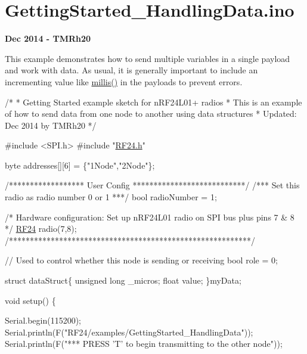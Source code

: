 \hypertarget{GettingStarted_HandlingData_8ino-example}{}\section{Getting\+Started\+\_\+\+Handling\+Data.\+ino}
{\bfseries Dec 2014 -\/ T\+M\+Rh20}~\newline


This example demonstrates how to send multiple variables in a single payload and work with data. As usual, it is generally important to include an incrementing value like \hyperlink{group__Porting__General_gad5b3ec1ce839fa1c4337a7d0312e9749}{millis()} in the payloads to prevent errors.


\begin{DoxyCodeInclude}

\textcolor{comment}{/*}
\textcolor{comment}{* Getting Started example sketch for nRF24L01+ radios}
\textcolor{comment}{* This is an example of how to send data from one node to another using data structures}
\textcolor{comment}{* Updated: Dec 2014 by TMRh20}
\textcolor{comment}{*/}

\textcolor{preprocessor}{#include <SPI.h>}
\textcolor{preprocessor}{#include "\hyperlink{RF24_8h}{RF24.h}"}

byte addresses[][6] = \{\textcolor{stringliteral}{"1Node"},\textcolor{stringliteral}{"2Node"}\};


\textcolor{comment}{/****************** User Config ***************************/}
\textcolor{comment}{/***      Set this radio as radio number 0 or 1         ***/}
\textcolor{keywordtype}{bool} radioNumber = 1;

\textcolor{comment}{/* Hardware configuration: Set up nRF24L01 radio on SPI bus plus pins 7 & 8 */}
\hyperlink{classRF24}{RF24} radio(7,8);
\textcolor{comment}{/**********************************************************/}


\textcolor{comment}{// Used to control whether this node is sending or receiving}
\textcolor{keywordtype}{bool} role = 0;

\textcolor{keyword}{struct }dataStruct\{
  \textcolor{keywordtype}{unsigned} \textcolor{keywordtype}{long} \_micros;
  \textcolor{keywordtype}{float} value;
\}myData;

\textcolor{keywordtype}{void} setup() \{

  Serial.begin(115200);
  Serial.println(F(\textcolor{stringliteral}{"RF24/examples/GettingStarted\_HandlingData"}));
  Serial.println(F(\textcolor{stringliteral}{"*** PRESS 'T' to begin transmitting to the other node"}));
  

\end{DoxyCodeInclude}
